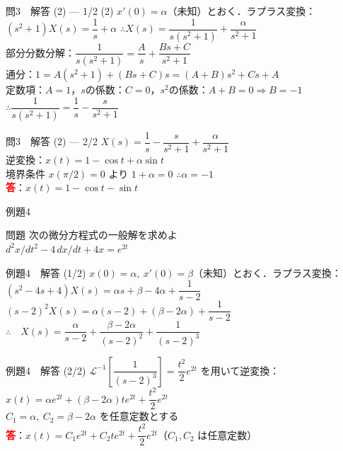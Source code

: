 \documentclass[professionalfonts]{beamer}
\begin{document}
\begin{frame}{問3　解答 (2) --- 1/2}
  (2) $x'(0)=\alpha$（未知）とおく．ラプラス変換：\\[4pt]
  $(s^{2}+1)X(s) = \dfrac{1}{s}+\alpha$ \quad $\therefore X(s) = \dfrac{1}{s(s^{2}+1)}+\dfrac{\alpha}{s^{2}+1}$\\[4pt]
  部分分数分解：$\dfrac{1}{s(s^{2}+1)} = \dfrac{A}{s} + \dfrac{Bs+C}{s^{2}+1}$\\[4pt]
  通分：$1 = A(s^{2}+1) + (Bs+C)s = (A+B)s^{2} + Cs + A$\\[4pt]
  定数項：$A=1$，\quad $s$の係数：$C=0$，\quad $s^{2}$の係数：$A+B=0 \Rightarrow B=-1$\\[4pt]
  $\therefore \dfrac{1}{s(s^{2}+1)} = \dfrac{1}{s} - \dfrac{s}{s^{2}+1}$
\end{frame}

\begin{frame}{問3　解答 (2) --- 2/2}
  $X(s) = \dfrac{1}{s}-\dfrac{s}{s^{2}+1}+\dfrac{\alpha}{s^{2}+1}$\\[4pt]
  逆変換：$x(t) = 1-\cos t+\alpha\sin t$\\[4pt]
  境界条件 $x(\pi/2)=0$ より $1+\alpha=0$ \quad $\therefore \alpha=-1$
  \\[8pt]\textcolor{red}{\textbf{答}}：$x(t) = 1-\cos t-\sin t$
\end{frame}

\begin{frame}{例題4}
  \begin{exampleblock}{問題}
    次の微分方程式の一般解を求めよ\\[2pt]
    $d^{2}x/dt^{2} - 4\,dx/dt + 4x = e^{2t}$
  \end{exampleblock}
\end{frame}

\begin{frame}{例題4　解答 (1/2)}
  $x(0)=\alpha,\ x'(0)=\beta$（未知）とおく．ラプラス変換：\\[4pt]
  $(s^{2}-4s+4)X(s) = \alpha s+\beta-4\alpha+\dfrac{1}{s-2}$\\[4pt]
  $(s-2)^{2}X(s) = \alpha(s-2)+(\beta-2\alpha)+\dfrac{1}{s-2}$\\[6pt]
  $\therefore\quad X(s) = \dfrac{\alpha}{s-2}+\dfrac{\beta-2\alpha}{(s-2)^{2}}+\dfrac{1}{(s-2)^{3}}$
\end{frame}

\begin{frame}{例題4　解答 (2/2)}
  $\mathcal{L}^{-1}\!\left[\dfrac{1}{(s-2)^{3}}\right]=\dfrac{t^{2}}{2}e^{2t}$ を用いて逆変換：\\[4pt]
  $x(t)=\alpha e^{2t}+(\beta-2\alpha)te^{2t}+\dfrac{t^{2}}{2}e^{2t}$\\[4pt]
  $C_{1}=\alpha,\ C_{2}=\beta-2\alpha$ を任意定数とする
  \\[8pt]\textcolor{red}{\textbf{答}}：$x(t)=C_{1}e^{2t}+C_{2}te^{2t}+\dfrac{t^{2}}{2}e^{2t}$（$C_{1},C_{2}$ は任意定数）
\end{frame}
\end{document}
